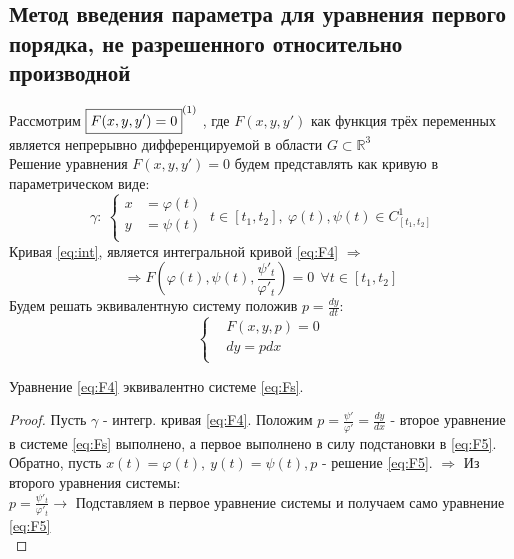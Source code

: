 \subsection{Метод введения параметра для уравнения первого порядка, не разрешенного относительно производной}
\begin{proposition}
	Рассмотрим $ \boxed{F(x,  y, y') = 0}^{\eqnum\label{eq:F4}} \ $, где $ F(x, y, y') $ как функция трёх переменных является непрерывно дифференцируемой в области $ G \subset \mathbb{ R }^3 $ \\
	Решение уравнения $F(x, y, y') = 0 $ будем представлять как кривую в параметрическом виде: \\
	\begin{equation} \label{eq:int}
	\gamma: \	\left\{
	\begin{aligned}
		x &= \varphi(t)  \\
		y &= \psi(t) \\   
	\end{aligned}
	\right. \ t \in [t_1, t_2], \ \varphi(t), \psi(t) \in C^1_{[t_1, t_2]}                                             
	\end{equation}
	Кривая \eqref{eq:int}, является интегральной кривой \eqref{eq:F4} $ \Rightarrow $ \\
	\begin{equation} \label{eq:F5}
	 \Rightarrow F\left(\varphi(t), \psi(t), \frac{\psi'_t}{\varphi'_t}\right) = 0 \ \ \forall t \in [t_1, t_2] 
	\end{equation}
	Будем решать эквивалентную систему положив $ p = \frac{dy}{dt} $: 
	\begin{equation} \label{eq:Fs}
		\left\{
		\begin{aligned}
			&F(x, y, p) = 0  \\
			&dy = pdx \\   
		\end{aligned}
		\right.                                                          
	\end{equation}
\end{proposition}

\begin{proposition}
	Уравнение \eqref{eq:F4} эквивалентно системе \eqref{eq:Fs}.
\end{proposition}

\begin{proof}
	Пусть $ \gamma $ - интегр. кривая \eqref{eq:F4}. Положим $ p = \frac{\psi'}{\varphi'} = \frac{dy}{dx} $ - второе уравнение в системе \eqref{eq:Fs} выполнено, а первое выполнено в силу подстановки в \eqref{eq:F5}. Обратно, пусть $x(t) = \varphi(t), \ y(t) = \psi(t), p$ - решение \eqref{eq:F5}. $ \Rightarrow$ Из второго уравнения системы:\\ 
	$ p = \frac{\psi'_t}{\varphi'_t} \rightarrow $ Подставляем в первое уравнение системы и получаем само уравнение \eqref{eq:F5}\\
\end{proof}

